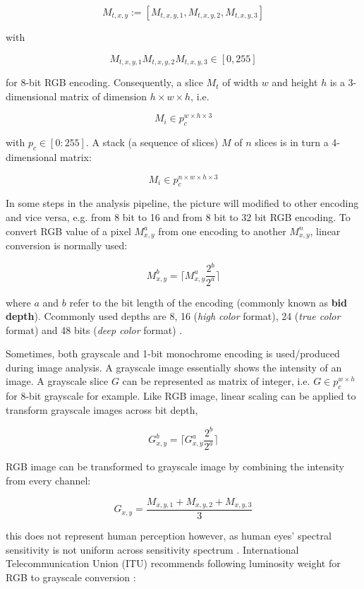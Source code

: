 \documentclass[pdftex,12pt,a4paper]{report}
\begin{document}
$$
M_{t, x, y} := [M_{t, x, y, 1}, M_{t, x, y, 2}, M_{t, x, y, 3}]
$$

with

$$
M_{t, x, y, 1} M_{t, x, y, 2} M_{t, x, y, 3} \in [0,255]
$$

for 8-bit RGB encoding. Consequently, a slice $M_t$ of width $w$ and height $h$ is a 3-dimensional matrix of dimension $h \times w \times h$, i.e.

$$
M_i \in p_c^{w \times h \times 3}
$$ 

with $p_c \in [0:255]$. A stack (a sequence of slices) $M$ of $n$ slices is in turn a 4-dimensional matrix:

$$
M_i \in p_c^{n \times w \times h \times 3}
$$ 

In some steps in the analysis pipeline, the picture will modified to other encoding and vice versa, e.g. from 8 bit to 16 and from 8 bit to 32 bit RGB encoding. To convert RGB value of a pixel $M^a_{x,y}$ from one encoding to another $M^n_{x,y}$, linear conversion is normally used:

$$
M^b_{x,y} = \lceil M^a_{x,y} \frac{2^b}{2^a} \rceil
$$

where $a$ and $b$ refer to the bit length of the encoding (commonly known as \textbf{bid depth}).  Ccommonly used depths are 8, 16 (\textit{high color} format), 24 (\textit{true color} format) and 48 bits (\textit{deep color} format) \cite{lim1990two, sharma1997digital, sullivan2012overview}. 

Sometimes, both grayscale and 1-bit monochrome encoding is used/produced during image analysis. A grayscale image essentially shows the intensity of an image. A grayscale slice $G$ can be represented as matrix of integer, i.e. $G \in p_c^{w \times h}$ for 8-bit grayscale for example. Like RGB image, linear scaling can be applied to transform grayscale images across bit depth,

$$
G^b_{x,y} = \lceil G^a_{x,y} \frac{2^b}{2^a} \rceil
$$

RGB image can be transformed to grayscale image by combining the intensity from every channel:

$$
G_{x, y} = \frac{M_{x, y, 1} + M_{x, y, 2} + M_{x, y, 3}}{3}
$$

this does not represent human perception however, as human eyes' spectral sensitivity is not uniform across sensitivity spectrum \cite{wyszecki1982color}. International Telecommunication Union (ITU) recommends following luminosity weight for RGB to grayscale conversion \cite{itu2007studio}:
\end{document}
